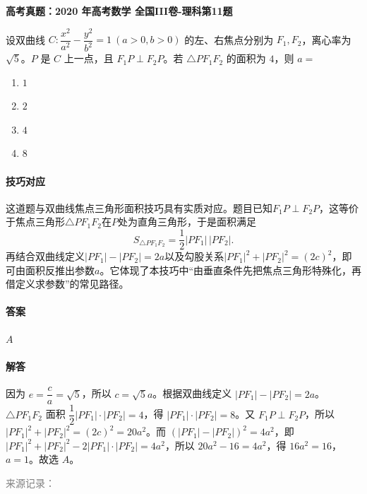 \documentclass[UTF8,a4paper,11pt]{ctexart}
\newenvironment{gaokao}[1]{\par\medskip\noindent\textbf{高考真题：#1}\par\smallskip}{\par\medskip}
\begin{document}
\begin{gaokao}{2020 年高考数学 全国III卷-理科第11题}

设双曲线 $C:\dfrac{x^2}{a^2}-\dfrac{y^2}{b^2}=1\ (a>0,b>0)$ 的左、右焦点分别为 $F_1,F_2$，离心率为 $\sqrt{5}$。$P$ 是 $C$ 上一点，且 $F_1P\perp F_2P$。若 $\triangle PF_1F_2$ 的面积为 $4$，则 $a=$

\begin{enumerate}[label=\Alph*. ,itemsep=2pt]

\item $1$

\item $2$

\item $4$

\item $8$

\end{enumerate}

\paragraph{技巧对应}

这道题与双曲线焦点三角形面积技巧具有实质对应。题目已知$F_1P\perp F_2P$，这等价于焦点三角形$\triangle PF_1F_2$在$P$处为直角三角形，于是面积满足
\[
S_{\triangle PF_1F_2}=\frac12|PF_1|\,|PF_2|.
\]
再结合双曲线定义$|PF_1|-|PF_2|=2a$以及勾股关系$|PF_1|^2+|PF_2|^2=(2c)^2$，即可由面积反推出参数$a$。它体现了本技巧中“由垂直条件先把焦点三角形特殊化，再借定义求参数”的常见路径。

\paragraph{答案}

$A$

\paragraph{解答}

因为 $e=\dfrac{c}{a}=\sqrt{5}$，所以 $c=\sqrt{5}a$。根据双曲线定义 $|PF_1|-|PF_2|=2a$。$\triangle PF_1F_2$ 面积 $\dfrac12|PF_1|\cdot|PF_2|=4$，得 $|PF_1|\cdot|PF_2|=8$。又 $F_1P\perp F_2P$，所以 $|PF_1|^2+|PF_2|^2=(2c)^2=20a^2$。而 $(|PF_1|-|PF_2|)^2=4a^2$，即 $|PF_1|^2+|PF_2|^2-2|PF_1|\cdot|PF_2|=4a^2$，所以 $20a^2-16=4a^2$，得 $16a^2=16$，$a=1$。故选 $A$。

\par\smallskip\textcolor{gray}{\footnotesize 来源记录：\texttt{}}

\end{gaokao}
\end{document}
